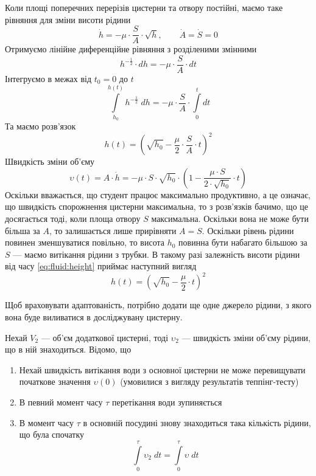 Коли площі поперечних перерізів цистерни та отвору постійні, маємо таке рівняння
для зміни висоти рідини
\begin{equation*}
  \dot{h}
  = - \mu \cdot \frac{S}{A} \cdot \sqrt{h},
  \qquad  \dot{A} = \dot{S} = 0
\end{equation*}
Отримуємо лінійне диференційне рівняння з розділеними змінними
\begin{equation*}
  h^{-\frac{1}{2}} \cdot dh
  = - \mu \cdot \frac{S}{A} \cdot dt
\end{equation*}
Інтегруємо в межах від $t_0 = 0$ до $t$
\begin{equation*}
  \int\limits_{h_0}^{h\left( t \right)} h^{-\frac{1}{2}} \; dh
  = - \mu \cdot \frac{S}{A} \cdot \int\limits_0^t dt
\end{equation*}
Та маємо розв’язок
\begin{equation}\label{eq:fluid:height}
  h\left( t \right)
  = \left( \sqrt{h_0}
    - \frac{\mu}{2} \cdot \frac{S}{A} \cdot t \right)^2
\end{equation}
Швидкість зміни об’єму
\begin{equation}\label{eq:fluid:velocity}
  \upsilon\left( t \right)
  = A \cdot \dot{h}
  = - \mu \cdot S \cdot \sqrt{h_0}
    \cdot \left( 1 - \frac{\mu \cdot S}{2 \cdot \sqrt{h_0}} \cdot t \right)
\end{equation}
Оскільки вважається, що студент працює максимально продуктивно, а це означає,
що швидкість спорожнення цистерни максимальна, то з розв’язків
бачимо, що це досягається тоді, коли площа отвору $S$ максимальна.
Оскільки вона не може бути більша за $A$, то залишається лише прирівняти
$A = S$.
Оскільки рівень рідини повинен зменшуватися повільно, то висота $h_0$ повинна
бути набагато більшою за $S$ --- маємо витікання рідини з трубки.
В такому разі залежність висоти рідини від часу \eqref{eq:fluid:height} приймає
наступний вигляд
\begin{equation*}
  h\left( t \right)
  = \left( \sqrt{h_0}
    - \frac{\mu}{2} \cdot t \right)^2
\end{equation*}

Щоб враховувати адаптованість, потрібно додати ще одне джерело рідини,
з якого вона буде виливатися в досліджувану цистерну.

Нехай $V_2$ --- об’єм додаткової цистерні, тоді $\upsilon_2$ --- швидкість
зміни об’єму рідини, що в ній знаходиться.
Відомо, що
\begin{enumerate}
  \item Нехай швидкість витікання води з основної цистерни не може перевищувати
    початкове значення $\upsilon\left( 0 \right)$ (умовилися з вигляду
    результатів теппінг-тесту)
  \item В певний момент часу $\tau$ перетікання води зупиняється
  \item В момент часу $\tau$ в основній посудині знову знаходиться така
    кількість рідини, що була спочатку
    \begin{equation*}
      \int\limits_{0}^{\tau} \upsilon_2 \; dt
      = \int\limits_{0}^{\tau} \upsilon \; dt
    \end{equation*}
\end{enumerate}

